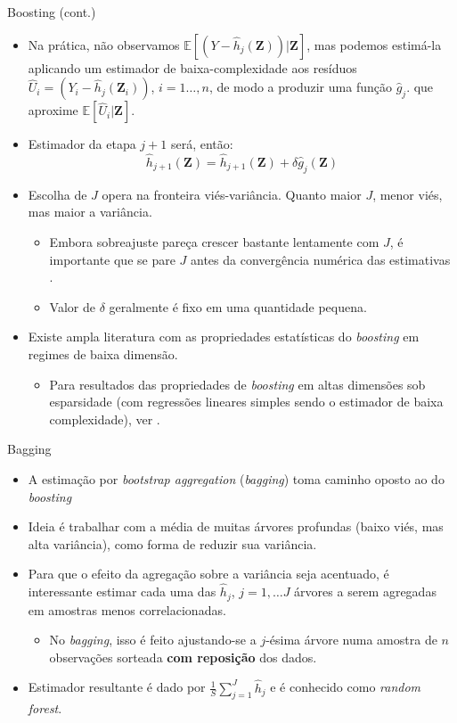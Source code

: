\documentclass[11pt]{beamer}
\begin{document}
\begin{frame}{Boosting (cont.)}
\begin{itemize}
	 \item Na prática, não observamos $ \mathbb{E}[(Y-\hat{h}_j(\boldsymbol{Z}))|\boldsymbol{Z}]$, mas podemos estimá-la aplicando um estimador de baixa-complexidade aos resíduos $\hat{U}_i = (Y_i-\hat{h}_j(\boldsymbol{Z}_i))$, $i=1\ldots, n$, de modo a produzir uma função $\hat{g}_j$. que aproxime $\mathbb{E}[\hat{U}_i|\boldsymbol{Z}]$.
	 \item Estimador da etapa $j+1$ será, então:
	$$\hat{h}_{j+1}(\boldsymbol{Z}) = \hat{h}_{j+1}(\boldsymbol{Z}) +\delta \hat{g}_j(\boldsymbol{Z})$$
	\item Escolha de $J$ opera na fronteira viés-variância. Quanto maior $J$, menor viés, mas maior a variância.
	\begin{itemize}
		\item Embora sobreajuste pareça crescer bastante lentamente com $J$, é importante que se pare $J$ antes da convergência numérica das estimativas \citep{buhlmann2003,buhlmann2007}.
		\item Valor de $\delta$ geralmente é fixo em uma quantidade pequena.
	\end{itemize}

		\item Existe ampla literatura com as propriedades estatísticas do \textit{boosting} em regimes de baixa dimensão.
		\begin{itemize}
	\item Para resultados das propriedades de \textit{boosting} em altas dimensões sob esparsidade (com regressões lineares simples sendo o estimador de baixa complexidade), ver \citet{Kueck2023}.
	\end{itemize}
\end{itemize}
\end{frame}

\begin{frame}{Bagging}
\begin{itemize}
	\item A estimação por \textit{bootstrap aggregation}  (\textit{bagging}) toma caminho oposto ao do \textit{boosting}
	\item Ideia é trabalhar com a média de muitas árvores profundas (baixo viés, mas alta variância), como forma de reduzir sua variância.
	\item Para que o efeito da agregação sobre a variância seja acentuado, é interessante estimar cada uma das $\hat{h}_j$, $j=1,\ldots J$ árvores a serem agregadas em amostras menos correlacionadas.
	\begin{itemize}
		\item No \textit{bagging}, isso é feito ajustando-se a $j$-ésima árvore numa amostra de $n$ observações sorteada \textbf{com reposição} dos dados.
	\end{itemize}
			\item Estimador resultante é dado por $\frac{1}{S}\sum_{j=1}^J \hat{h}_j$ e é conhecido como \textit{random forest}.
			
\end{itemize}
\end{frame}
\end{document}
